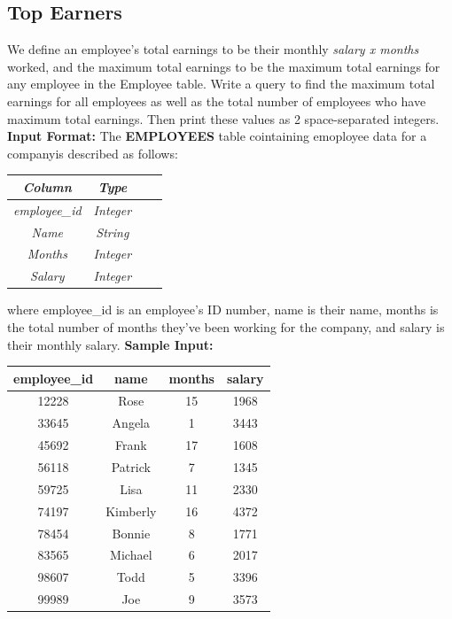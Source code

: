\documentclass[12pt,a4paper]{article}
\renewcommand{\arraystretch}{1.5} %
\begin{document}
\subsection{Top Earners}
We define an employee's total earnings to be their monthly \textit{salary x months} worked, and the maximum total earnings to be the maximum total earnings for any employee in the Employee table. Write a query to find the maximum total earnings for all employees as well as the total number of employees who have maximum total earnings. Then print these values as 2 space-separated integers.
\textbf{Input Format:}
The \textbf{EMPLOYEES} table cointaining emoployee data for a companyis described as follows:
\begin{table}[H]
\centering
\renewcommand{\arraystretch}{1.3}
\begin{tabular}{|c|c|c|c|}
\hline
\textit{Column} & \textit{Type} \\ \hline   
\textit{employee\_id} & \textit{Integer} \\ \hline
\textit{Name} & \textit{String} \\ \hline
\textit{Months} & \textit{Integer} \\\hline
\textit{Salary} & \textit{Integer} \\ \hline
\end{tabular}
\end{table}
where employee\_id is an employee's ID number, name is their name, months is the total number of months they've been working for the company, and salary is their monthly salary.
\newline
\textbf{Sample Input:}
\begin{table}[H]
\centering
\renewcommand{\arraystretch}{1.25}
\begin{tabular}{|c|c|c|c|}
\hline
\textbf{employee\_id} & \textbf{name} & \textbf{months} & \textbf{salary} \\ \hline
12228 & Rose     & 15 & 1968 \\ \hline
33645 & Angela   & 1  & 3443 \\ \hline
45692 & Frank    & 17 & 1608 \\ \hline
56118 & Patrick  & 7  & 1345 \\ \hline
59725 & Lisa     & 11 & 2330 \\ \hline
74197 & Kimberly & 16 & 4372 \\ \hline
78454 & Bonnie   & 8  & 1771 \\ \hline
83565 & Michael  & 6  & 2017 \\ \hline
98607 & Todd     & 5  & 3396 \\ \hline
99989 & Joe      & 9  & 3573 \\ \hline
\end{tabular}
\end{table}
\end{document}
